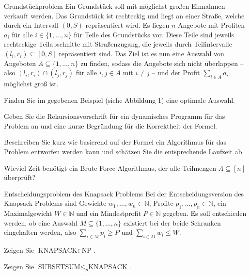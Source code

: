 \documentclass{exercisesheet}
\begin{document}
\begin{eexercises}{Grundstückproblem}{
    Ein Grundstück soll mit möglichst großen Einnahmen verkauft werden. Das Grundstück ist rechteckig und liegt an einer Straße, welche durch ein Intervall $(0, S)$ repräsentiert wird. Es liegen $n$ Angebote mit Profiten $a_i$ für alle $i \in \{1, \ldots, n\}$ für Teile des Grundstücks vor. Diese Teile sind jeweils rechteckige Teilabschnitte mit Straßenzugang, die jeweils durch Teilintervalle $(l_i, r_i) \subseteq [0, S]$ repräsentiert sind. Das Ziel ist es nun eine Auswahl von Angeboten $A \subseteq \{1, \ldots, n\}$ zu finden, sodass die Angebote sich nicht überlappen – also $(l_i, r_i) \cap (l_j, r_j)$ für alle $i,j \in A$ mit $i \neq j$ – und der Profit $\sum_{i \in A} a_i$ möglichst groß ist.
  }
  \item Finden Sie im gegebenen Beispiel (siehe Abbildung 1) eine optimale Auswahl.
  \item Geben Sie die Rekursionsvorschrift für ein dynamisches Programm für das Problem an und eine kurze Begründung für die Korrektheit der Formel.
  \item Beschreiben Sie kurz wie basierend auf der Formel ein Algorithmus für das Problem entworfen werden kann und schätzen Sie die entsprechende Laufzeit ab.
  \item Wieviel Zeit benötigt ein Brute-Force-Algorithmus, der alle Teilmengen $A \subseteq [n]$ überprüft?
\end{eexercises}

\begin{eexercises}{Entscheidungsproblem des Knapsack Problems}{
    Bei der Entscheidungsversion des Knapsack Problems sind Gewichte $w_1, \ldots, w_n \in \mathbb{N}$, Profite $p_1, \ldots, p_n \in \mathbb{N}$, ein Maximalgewicht $W \in \mathbb{N}$ und ein Mindestprofit $P \in \mathbb{N}$ gegeben. Es soll entschieden werden, ob eine Auswahl $M \subseteq \{1, \ldots, n\}$ existiert bei der beide Schranken eingehalten werden, also $\sum_{i \in M} p_i \geq P$ und $\sum_{i \in M} w_i \leq W$.
  }
  \item Zeigen Sie $\text{KNAPSACK} \in \text{NP}$.
  \item Zeigen Sie $\text{SUBSETSUM} \leq_p \text{KNAPSACK}$.
\end{eexercises}
\end{document}
